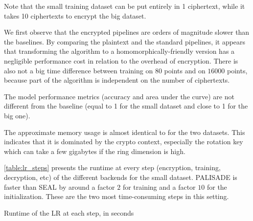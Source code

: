 \documentclass[a4paper,11pt,oneside]{report}
\begin{document}
Note that the small training dataset can be put entirely in 1 ciphertext, while it takes 10 ciphertexts to encrypt the big dataset.

We first observe that the encrypted pipelines are orders of magnitude slower than the baselines.
By comparing the plaintext and the standard pipelines, it appears that transforming the algorithm to a homomorphically-friendly version has a negligible performance cost in relation to the overhead of encryption.
There is also not a big time difference between training on $80$ points and on $16000$ points, because part of the algorithm is independent on the number of ciphertexts.

The model performance metrics (accuracy and area under the curve) are not different from the baseline (equal to 1 for the small dataset and close to 1 for the big one).

The approximate memory usage is almost identical to for the two datasets.
This indicates that it is dominated by the crypto context, especially the rotation key which can take a few gigabytes if the ring dimension is high. 

\autoref{table:lr_steps} presents the runtime at every step (encryption, training, decryption, etc) of the different backends for the small dataset.
PALISADE is faster than SEAL by around a factor $2$ for training and a factor $10$ for the initialization. 
These are the two most time-consuming steps in this setting.

\begin{table}[h!]
  \begin{center}
    \caption{Runtime of the LR at each step, in seconds}
    \label{table:lr_steps}
  \end{center}
\end{table}
\end{document}
